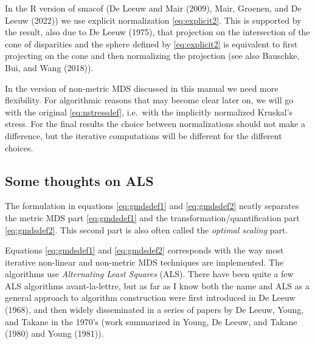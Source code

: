 \documentclass[
  12pt,
]{article}
\begin{document}
In the R version of smacof (De Leeuw and Mair (2009),
Mair, Groenen, and De Leeuw (2022)) we use explicit normalization
\eqref{eq:explicit2}. This is supported by the result, also due to
De Leeuw (1975), that projection on the intersection of the cone of
disparities and the sphere defined by \eqref{eq:explicit2} is equivalent
to first projecting on the cone and then normalizing the projection (see
also Bauschke, Bui, and Wang (2018)).

In the version of non-metric MDS discussed in this manual we need more flexibility. For algorithmic reasons that may become clear later on, we will go with the original \eqref{eq:nstressdef}, i.e.~with the implicitly normalized
Kruskal's stress. For the final results the choice between normalizations should not make a difference, but the iterative computations will be different for the
different choices.

\subsection{Some thoughts on ALS}\label{some-thoughts-on-als}

The formulation in equations \eqref{eq:gmdsdef1} and \eqref{eq:gmdsdef2} neatly separates the
metric MDS part \eqref{eq:gmdsdef1} and the transformation/quantification part \eqref{eq:gmdsdef2}.
This second part is also often called the \emph{optimal scaling} part.

Equations \eqref{eq:gmdsdef1} and \eqref{eq:gmdsdef2} corresponds with the way most iterative non-linear and non-metric MDS techniques are implemented. The algorithms use \emph{Alternating Least Squares} (ALS).
There have been quite a few ALS algorithms avant-la-lettre, but as far as I know both the name
and ALS as a general approach to algorithm construction were first introduced in De Leeuw (1968), and then widely disseminated in a series of papers by
De Leeuw, Young, and Takane in the 1970's (work summarized in Young, De Leeuw, and Takane (1980) and Young (1981)).
\end{document}
